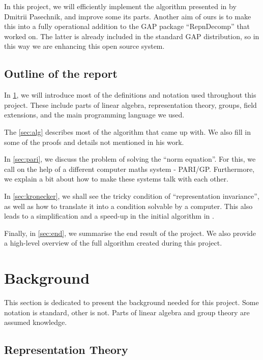 \documentclass[11pt]{article}
\begin{document}
In this project, we will efficiently implement the algorithm presented
in \cite{Pas21} by Dmitrii Pasechnik, and improve some its parts. Another aim of
ours is to make this into a fully operational addition to the GAP package
``RepnDecomp'' that \cite{Hymabaccus2020} worked on. The latter is already
included in the standard GAP distribution, so in this way we are enhancing this
open source system.

\subsection{Outline of the report}
In \cref{sec:bg}, we will introduce most of the definitions and notation used
throughout this project. These include parts of linear algebra, representation
theory, groups, field extensions, and the main programming language we used.

The \cref{sec:alg} describes most of the algorithm that \cite{Pas21} came up
with. We also fill in some of the proofs and details not mentioned in his work.

In \cref{sec:pari}, we discuss the problem of solving the ``norm equation''. For
this, we call on the help of a different computer maths system - PARI/GP.
Furthermore, we explain a bit about how to make these systems talk with each other.

In \cref{sec:kronecker}, we shall see the tricky condition of ``representation
invariance'', as well as how to translate it into a condition solvable by a
computer. This also leads to a simplification and a speed-up
in the initial algorithm in \cite{Pas21}.

Finally, in \cref{sec:end}, we summarise the end result of the project. We also
provide a high-level overview of the full algorithm created during this project.

\newpage

\section{Background} \label{sec:bg}

This section is dedicated to present the background needed for
this project. Some notation is standard, other is not. Parts of linear algebra
and group theory are assumed knowledge.

\subsection{Representation Theory}
\end{document}
